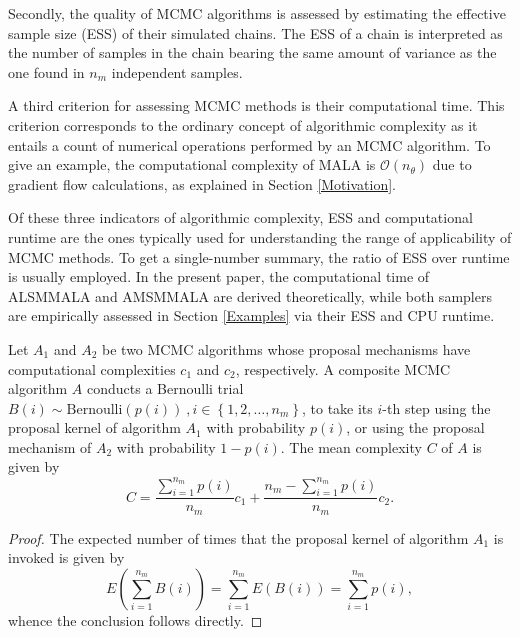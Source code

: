 \documentclass[twoside,11pt]{article}
\begin{document}
Secondly, the quality of MCMC algorithms is assessed by estimating the effective sample size (ESS) of their simulated chains.
The ESS of a chain is interpreted as the number of samples in the chain bearing the same amount of variance as the one found 
in $n_m$ independent samples.

A third criterion for assessing MCMC methods is their computational time.
This criterion corresponds to the ordinary concept of algorithmic complexity as it entails a count of numerical operations
performed by an MCMC algorithm. To give an example, the computational complexity of MALA is $\mathcal{O}(n_{\theta})$ due to 
gradient flow calculations, as explained in Section \ref{Motivation}.

Of these three indicators of algorithmic complexity, ESS and computational runtime are the ones typically used for
understanding the range of applicability of MCMC methods. To get a single-number summary, the ratio of ESS over runtime is
usually employed. In the present paper, the computational time of ALSMMALA and AMSMMALA are derived theoretically, while both
samplers are empirically assessed in Section \ref{Examples} via their ESS and CPU runtime.

\begin{theorem}
Let $A_1$ and $A_2$ be two MCMC algorithms whose proposal mechanisms have computational complexities $c_1$ and $c_2$, 
respectively. A composite MCMC algorithm $A$ conducts a Bernoulli trial
$B(i)\sim\mbox{Bernoulli}(p(i))~,i\in\left\{1,2,\dots,n_m\right\}$, to take its $i$-th step using the proposal kernel of 
algorithm $A_1$ with probability $p(i)$, or using the proposal mechanism of $A_2$ with probability $1-p(i)$. The mean 
complexity $C$ of $A$ is given by
\begin{equation}
\label{eq:c}
C=\dfrac{\sum_{i=1}^{n_m}p(i)}{n_m}c_1+\dfrac{n_m-\sum_{i=1}^{n_m}p(i)}{n_m}c_2.
\end{equation}
\end{theorem}

\begin{proof}
The expected number of times that the proposal kernel of algorithm $A_1$ is invoked is given by 
\begin{equation*}
E\left(\sum_{i=1}^{n_m}B(i)\right)=\sum_{i=1}^{n_m}E(B(i))=\sum_{i=1}^{n_m}p(i),
\end{equation*}
whence the conclusion follows directly.
\end{proof}	

\end{document}
